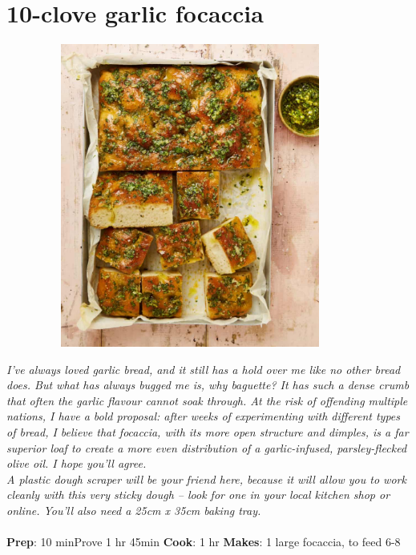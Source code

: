 \documentclass{book}
\begin{document}
\section{10-clove garlic focaccia}
\begin{figure}
\centering\includegraphics[width=10cm,height=10cm,keepaspectratio]{Recipe_Pictures/10-clove_garlic_focaccia.png}
\end{figure}
\emph{I’ve always loved garlic bread, and it still has a hold over me like no other bread does. But what has always bugged me is, why baguette? It has such a dense crumb that often the garlic flavour cannot soak through. At the risk of offending multiple nations, I have a bold proposal: after weeks of experimenting with different types of bread, I believe that focaccia, with its more open structure and dimples, is a far superior loaf to create a more even distribution of a garlic-infused, parsley-flecked olive oil. I hope you’ll agree.\\ 
A plastic dough scraper will be your friend here, because it will allow you to work cleanly with this very sticky dough – look for one in your local kitchen shop or online. You’ll also need a 25cm x 35cm baking tray.}\\\\ 
\textbf{Prep}: 10 minProve 1 hr 45min
\textbf{Cook}: 1 hr
\textbf{Makes}: 1 large focaccia, to feed 6-8
\end{document}
